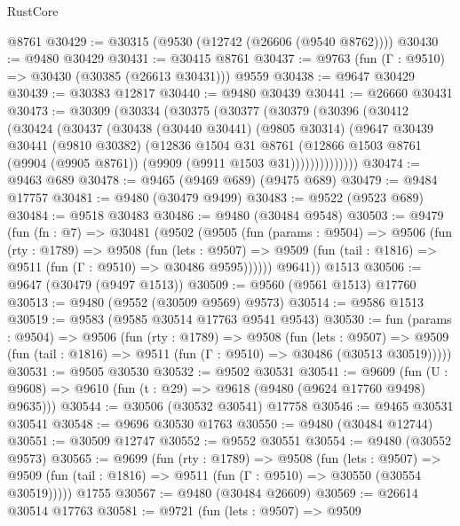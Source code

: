 \begin{lexlean}{RustCore}
\begin{coremodule}
    @8761
@30429 := @30315 (@9530 (@12742 (@26606 (@9540 @8762))))
@30430 := @9480 @30429
@30431 := @30415 @8761
@30437 := @9763 (fun (Γ : @9510) => @30430 (@30385 (@26613 @30431))) @9559
@30438 := @9647 @30429
@30439 := @30383 @12817
@30440 := @9480 @30439
@30441 := @26660 @30431
@30473 := @30309
    (@30334
      (@30375
        (@30377
          (@30379
            (@30396
              (@30412
                (@30424
                  (@30437
                    (@30438
                      (@30440 @30441)
                      (@9805 @30314)
                      (@9647
                        @30439
                        @30441
                        (@9810 @30382)
                        (@12836
                          @1504
                          @31
                          @8761
                          (@12866
                            @1503
                            @8761
                            (@9904 (@9905 @8761))
                            (@9909 (@9911 @1503 @31))))))))))))))
@30474 := @9463 @689
@30478 := @9465 (@9469 @689) (@9475 @689)
@30479 := @9484 @17757
@30481 := @9480 (@30479 @9499)
@30483 := @9522 (@9523 @689)
@30484 := @9518 @30483
@30486 := @9480 (@30484 @9548)
@30503 := @9479
    (fun (fn : @7) =>
    @30481
      (@9502
        (@9505
          (fun (params : @9504) =>
          @9506
            (fun (rty : @1789) =>
            @9508
              (fun (lets : @9507) =>
              @9509 (fun (tail : @1816) => @9511 (fun (Γ : @9510) => @30486 @9595))))))
        @9641))
    @1513
@30506 := @9647 (@30479 (@9497 @1513))
@30509 := @9560 (@9561 @1513) @17760
@30513 := @9480 (@9552 (@30509 @9569) @9573)
@30514 := @9586 @1513
@30519 := @9583 (@9585 @30514 @17763 @9541 @9543)
@30530 := fun (params : @9504) =>
  @9506
    (fun (rty : @1789) =>
    @9508
      (fun (lets : @9507) =>
      @9509 (fun (tail : @1816) => @9511 (fun (Γ : @9510) => @30486 (@30513 @30519)))))
@30531 := @9505 @30530
@30532 := @9502 @30531
@30541 := @9609
    (fun (U : @9608) => @9610 (fun (t : @29) => @9618 (@9480 (@9624 @17760 @9498) @9635)))
@30544 := @30506 (@30532 @30541) @17758
@30546 := @9465 @30531 @30541
@30548 := @9696 @30530 @1763
@30550 := @9480 (@30484 @12744)
@30551 := @30509 @12747
@30552 := @9552 @30551
@30554 := @9480 (@30552 @9573)
@30565 := @9699
    (fun (rty : @1789) =>
    @9508
      (fun (lets : @9507) =>
      @9509 (fun (tail : @1816) => @9511 (fun (Γ : @9510) => @30550 (@30554 @30519)))))
    @1755
@30567 := @9480 (@30484 @26609)
@30569 := @26614 @30514 @17763
@30581 := @9721
    (fun (lets : @9507) =>
    @9509

\end{coremodule}
\end{lexlean}
